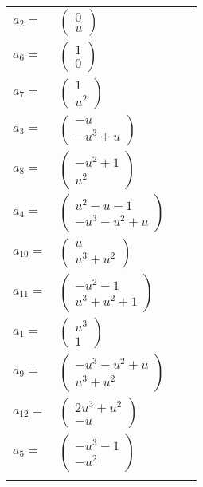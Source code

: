 \documentclass[1p]{elsarticle_modified}
\theoremstyle{definition}
\begin{document}
\begin{tabular}{m{7pt} m{180pt} m{7pt} m{180pt} }
\flushright $a_{2}=$&$\begin{pmatrix}0\\u\end{pmatrix}$ \\
\flushright $a_{6}=$&$\begin{pmatrix}1\\0\end{pmatrix}$ \\
\flushright $a_{7}=$&$\begin{pmatrix}1\\u^2\end{pmatrix}$ \\
\flushright $a_{3}=$&$\begin{pmatrix}- u\\- u^3+u\end{pmatrix}$ \\
\flushright $a_{8}=$&$\begin{pmatrix}- u^2+1\\u^2\end{pmatrix}$ \\
\flushright $a_{4}=$&$\begin{pmatrix}u^2- u-1\\- u^3- u^2+u\end{pmatrix}$ \\
\flushright $a_{10}=$&$\begin{pmatrix}u\\u^3+u^2\end{pmatrix}$ \\
\flushright $a_{11}=$&$\begin{pmatrix}- u^2-1\\u^3+u^2+1\end{pmatrix}$ \\
\flushright $a_{1}=$&$\begin{pmatrix}u^3\\1\end{pmatrix}$ \\
\flushright $a_{9}=$&$\begin{pmatrix}- u^3- u^2+u\\u^3+u^2\end{pmatrix}$ \\
\flushright $a_{12}=$&$\begin{pmatrix}2 u^3+u^2\\- u\end{pmatrix}$ \\
\flushright $a_{5}=$&$\begin{pmatrix}- u^3-1\\- u^2\end{pmatrix}$\\&\end{tabular}
\end{document}
